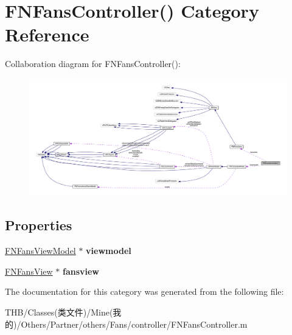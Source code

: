 \hypertarget{category_f_n_fans_controller_07_08}{}\section{F\+N\+Fans\+Controller() Category Reference}
\label{category_f_n_fans_controller_07_08}


Collaboration diagram for F\+N\+Fans\+Controller()\+:\nopagebreak
\begin{figure}[H]
\begin{center}
\leavevmode
\includegraphics[width=350pt]{category_f_n_fans_controller_07_08__coll__graph}
\end{center}
\end{figure}
\subsection*{Properties}
\begin{DoxyCompactItemize}
\item 
\mbox{\label{category_f_n_fans_controller_07_08_abb7c538ba8a3106173fa1e48dff6fca9}} 
\mbox{\hyperlink{interface_f_n_fans_view_model}{F\+N\+Fans\+View\+Model}} $\ast$ {\bfseries viewmodel}
\item 
\mbox{\label{category_f_n_fans_controller_07_08_a4e1010797f1989089b0baf6a65ec605c}} 
\mbox{\hyperlink{interface_f_n_fans_view}{F\+N\+Fans\+View}} $\ast$ {\bfseries fansview}
\end{DoxyCompactItemize}


The documentation for this category was generated from the following file\+:\begin{DoxyCompactItemize}
\item 
T\+H\+B/\+Classes(类文件)/\+Mine(我的)/\+Others/\+Partner/others/\+Fans/controller/F\+N\+Fans\+Controller.\+m\end{DoxyCompactItemize}
